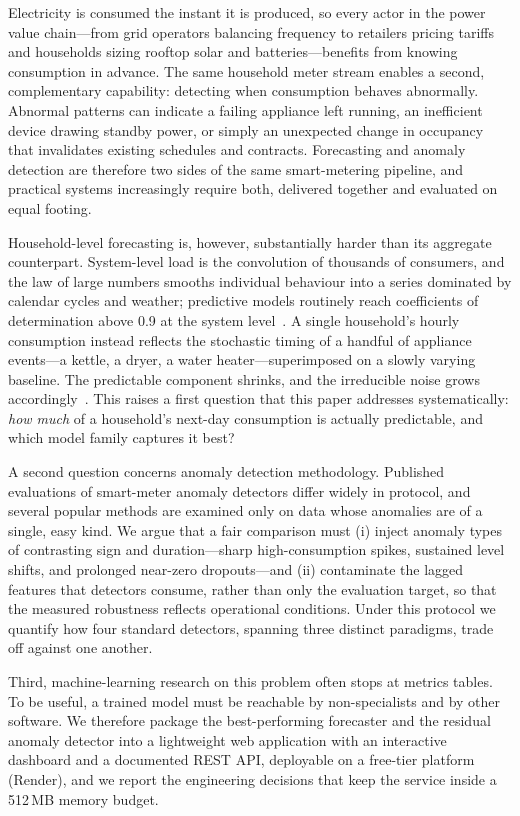 \documentclass[10pt,a4paper]{article}
\begin{document}
Electricity is consumed the instant it is produced, so every actor in the power
value chain---from grid operators balancing frequency to retailers pricing tariffs and
households sizing rooftop solar and batteries---benefits from knowing consumption in
advance. The same household meter stream enables a second, complementary capability:
detecting when consumption behaves abnormally. Abnormal patterns can indicate a failing appliance left running, an inefficient
device drawing standby power, or simply an unexpected change in occupancy that
invalidates existing schedules and contracts.
Forecasting and anomaly detection are therefore two sides of the same smart-metering
pipeline, and practical systems increasingly require both, delivered together and
evaluated on equal footing.

Household-level forecasting is, however, substantially harder than its aggregate
counterpart. System-level load is the convolution of thousands of consumers, and the
law of large numbers smooths individual behaviour into a series dominated by
calendar cycles and weather; predictive models routinely reach coefficients of
determination above 0.9 at the system level~\cite{alfares2002electric,hong2016probabilistic}.
A single household's hourly consumption instead reflects the stochastic timing of a
handful of appliance events---a kettle, a dryer, a water heater---superimposed on a
slowly varying baseline. The predictable component shrinks, and the irreducible noise
grows accordingly~\cite{kong2019lstm}. This raises a first question that this paper
addresses systematically: \emph{how much} of a household's next-day consumption is
actually predictable, and which model family captures it best?

A second question concerns anomaly detection methodology. Published evaluations of
smart-meter anomaly detectors differ widely in protocol, and several popular methods
are examined only on data whose anomalies are of a single, easy kind. We argue that a
fair comparison must (i) inject anomaly types of contrasting sign and duration---sharp
high-consumption spikes, sustained level shifts, and prolonged near-zero dropouts---and
(ii) contaminate the lagged features that detectors consume, rather than only the
evaluation target, so that the measured robustness reflects operational conditions.
Under this protocol we quantify how four standard detectors, spanning three distinct
paradigms, trade off against one another.

Third, machine-learning research on this problem often stops at metrics tables. To be
useful, a trained model must be reachable by non-specialists and by other software. We
therefore package the best-performing forecaster and the residual anomaly detector
into a lightweight web application with an interactive dashboard and a documented REST
API, deployable on a free-tier platform (Render), and we report the engineering
decisions that keep the service inside a 512\,MB memory budget.
\end{document}
